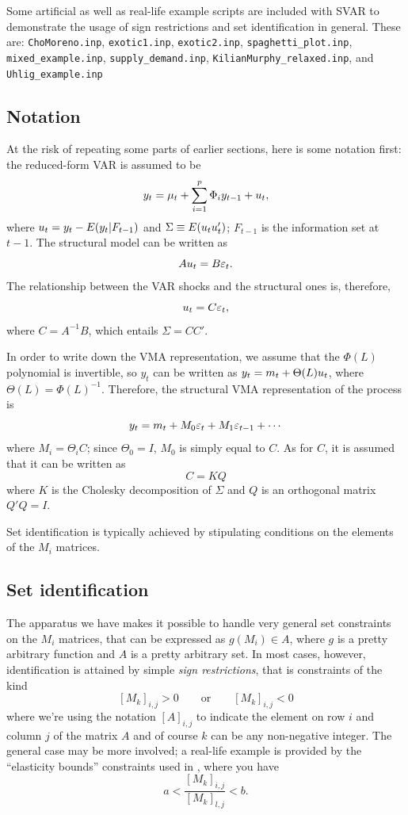 \documentclass[a4paper,10pt]{article}
\newcounter{script}[section]
\newcommand{\PrE}[1]{\ensuremath u_{#1}} %
\newcommand{\StS}[1]{\ensuremath \varepsilon_{#1}} %
\begin{document}
Some artificial as well as real-life example scripts are included with
SVAR to demonstrate the usage of sign restrictions and set
identification in general. These are: \texttt{ChoMoreno.inp},
\texttt{exotic1.inp}, \texttt{exotic2.inp},
\texttt{spaghetti\_plot.inp},
\texttt{mixed\_example.inp}, \texttt{supply\_demand.inp}, \texttt{KilianMurphy\_relaxed.inp},  and
\texttt{Uhlig\_example.inp}

\subsection{Notation}

At the risk of repeating some parts of earlier sections, here is some notation first:
the reduced-form VAR is assumed to be
\[
  y_t  =  \mu_t + \sum_{i=1}^p \Phi_i y_{t-1} + \PrE{t}, 
\]
where $\PrE{t} = y_t - E(y_t |F_{t-1})$ and
$\Sigma \equiv E(\PrE{t} \PrE{t}')$; $F_{t-1}$ is the information set
at $t-1$. The structural model can be written as
\[
  A \PrE{t} = B \StS{t} .
\]
The relationship between the VAR shocks and the structural ones is,
therefore,
\[
\PrE{t} = C \StS{t} ,
\]
where $C = A^{-1} B$, which entails $\Sigma = CC'$.

In order to write down the VMA representation, we assume that the
$\Phi(L)$ polynomial is invertible, so $y_t$ can be written as
$ y_t = m_t + \Theta(L) \PrE{t}$, where $\Theta(L) =
\Phi(L)^{-1}$. Therefore, the structural VMA representation of the
process is
\begin{equation}
  \label{eq:structVMA}
  y_t = m_t + M_0 \StS{t} + M_1 \StS{t-1} + \cdots
\end{equation}
where $M_i = \Theta_i C$; since $\Theta_0 = I$, $M_0$ is simply equal
to $C$. As for $C$, it is assumed that it can be written as
\begin{equation}
  \label{eq:rotation}
  C = K Q
\end{equation}
where $K$ is the Cholesky decomposition of $\Sigma$ and $Q$ is an
orthogonal matrix $Q'Q = I$.

Set identification is typically achieved by stipulating conditions on
the elements of the $M_i$ matrices.

\subsection{Set identification}

The apparatus we have makes it possible to handle very general set
constraints on the $M_i$ matrices, that can be expressed as
$g(M_i) \in A$, where $g$ is a pretty arbitrary function and $A$ is a
pretty arbitrary set. In most cases, however, identification is
attained by simple \emph{sign restrictions}, that is constraints of
the kind
\[
  [M_k]_{i,j} > 0 \qquad \mathrm{or} \qquad [M_k]_{i,j} < 0
\]
where we're using the notation $[A]_{i,j}$ to indicate the element on row
$i$ and column $j$ of the matrix $A$ and of course $k$ can be any
non-negative integer. The general case may be more involved; a
real-life example is provided by the ``elasticity bounds'' constraints
used in \citet{KilianMurphy2014}, where you have
\[
  a < \frac{[M_k]_{i,j}}{[M_k]_{l,j}} < b .
\]
\end{document}
